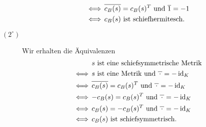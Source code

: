 \begin{description}
\begin{align*}
      \iff&\,
      \text{$\overline{\repmatrixbilone{s}{B}} = \repmatrixbilone{s}{B}^T$ und $\overline{1} = -1$}  \\
      \iff&\,
      \text{$\repmatrixbilone{s}{B}$ ist schiefhermitesch}.
    \end{align*}
  \item[$(2^\circ)$]
    Wir erhalten die Äquivalenzen
    \begin{align*}
          &\,
      \text{$s$ ist eine schiefsymmetrische Metrik}  \\
      \iff&\,
      \text{$s$ ist eine Metrik und $\overline{\,\cdot\,} = -\id_K$} \\
      \iff&\,
      \text{$\overline{\repmatrixbilone{s}{B}} = \repmatrixbilone{s}{B}^T$ und $\overline{\,\cdot\,} = -\id_K$}  \\
      \iff&\,
      \text{$-\repmatrixbilone{s}{B} = \repmatrixbilone{s}{B}^T$ und $\overline{\,\cdot\,} = -\id_K$}  \\
      \iff&\,
      \text{$\repmatrixbilone{s}{B} = -\repmatrixbilone{s}{B}^T$ und $\overline{\,\cdot\,} = -\id_K$}  \\
      \iff&\,
      \text{$\repmatrixbilone{s}{B}$ ist schiefsymmetrisch}.
    \end{align*}
\end{description}

